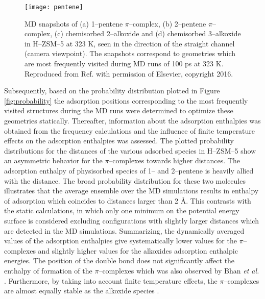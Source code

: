 \begin{figure}[!h]
	\centering
	\texttt{[image: pentene]}
	\caption[MD snapshots of (a) 1--pentene $\pi$--complex, (b) 2--pentene
	$\pi$--complex, (c) chemisorbed 2--alkoxide and (d) chemisorbed 3--alkoxide in
	H--ZSM--5 at 323 K, seen in the direction of the straight channel (camera
	viewpoint). The snapshots correspond to geometries which are most frequently visited during MD runs of
100 ps at 323 K.]{MD snapshots of (a) 1--pentene $\pi$--complex, (b) 2--pentene
	$\pi$--complex, (c) chemisorbed 2--alkoxide and (d) chemisorbed 3--alkoxide in
	H--ZSM--5 at 323 K, seen in the direction of the straight channel (camera
	viewpoint). The snapshots correspond to geometries which are most frequently visited during MD runs of
100 ps at 323 K. Reproduced from Ref. \cite{Hajek2016} with permission of
Elsevier, copyright 2016.}
	\label{fig:pentene}
\end{figure}
\clearpage
Subsequently, based on the
probability distribution plotted in Figure \ref{fig:probability} the adsorption
positions corresponding to the most frequently visited structures during the MD runs were determined to optimize these geometries statically. Thereafter, information about the adsorption enthalpies was obtained from the frequency calculations and the influence of finite temperature effects on the adsorption enthalpies was assessed.
The plotted probability distributions for the distances of the various adsorbed
species in H--ZSM--5 show an asymmetric behavior for the $\pi$--complexes
towards higher  distances.
The adsorption enthalpy of physisorbed species of 1-- and 2--pentene is heavily
allied with the  distance.
The broad probability distribution for these two molecules illustrates that the
average ensemble over the MD simulations results in enthalpy of adsorption which
coincides to  distances larger than 2 \AA.
This contrasts with the static calculations, in which only one minimum on the
potential energy surface is considered excluding configurations with slightly
larger distances which are detected in the MD simulations. Summarizing, the
dynamically averaged values of the adsorption enthalpies give systematically
lower values for the $\pi$--complexes and slightly higher values for the
alkoxides adsorption enthalpic energies. The position of the double bond does not significantly
affect the enthalpy of formation of the $\pi$--complexes which was also observed
by Bhan \textit{et al.} \cite{Bhan2003}. Furthermore, by taking into account
finite temperature effects, the $\pi$--complexes are almost equally stable as the
alkoxide species \cite{Hajek2016}.

